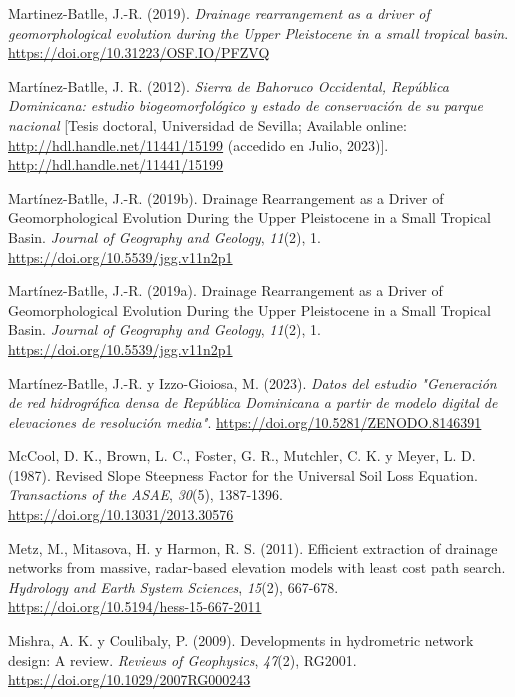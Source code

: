 \documentclass[spanish]{article}
\newlength{\cslhangindent}
\newlength{\cslentryspacingunit} %
\newenvironment{CSLReferences}[2] %
 {%
  \setlength{\parindent}{0pt}
  \ifodd #1
  \let\oldpar\par
  \def\par{\hangindent=\cslhangindent\oldpar}
  \fi
  \setlength{\parskip}{#2\cslentryspacingunit}
 }%
 {}
\begin{document}
\begin{CSLReferences}{1}{0}
\leavevmode{}%
Martinez-Batlle, J.-R. (2019). \emph{Drainage rearrangement as a driver
of geomorphological evolution during the Upper Pleistocene in a small
tropical basin}. \url{https://doi.org/10.31223/OSF.IO/PFZVQ}

\leavevmode{}%
Martínez-Batlle, J. R. (2012). \emph{{Sierra de Bahoruco Occidental,
República Dominicana: estudio biogeomorfológico y estado de conservación
de su parque nacional}} {[}Tesis doctoral, Universidad de Sevilla;
Available online: \url{http://hdl.handle.net/11441/15199} (accedido en
Julio, 2023){]}. \url{http://hdl.handle.net/11441/15199}

\leavevmode{}%
Martínez-Batlle, J.-R. (2019b). Drainage Rearrangement as a Driver of
Geomorphological Evolution During the Upper Pleistocene in a Small
Tropical Basin. \emph{Journal of Geography and Geology}, \emph{11}(2),
1. \url{https://doi.org/10.5539/jgg.v11n2p1}

\leavevmode{}%
Martínez-Batlle, J.-R. (2019a). Drainage Rearrangement as a Driver of
Geomorphological Evolution During the Upper Pleistocene in a Small
Tropical Basin. \emph{Journal of Geography and Geology}, \emph{11}(2),
1. \url{https://doi.org/10.5539/jgg.v11n2p1}

\leavevmode{}%
Martínez-Batlle, J.-R. y Izzo-Gioiosa, M. (2023). \emph{Datos del
estudio "Generación de red hidrográfica densa de República Dominicana a
partir de modelo digital de elevaciones de resolución media"}.
\url{https://doi.org/10.5281/ZENODO.8146391}

\leavevmode{}%
McCool, D. K., Brown, L. C., Foster, G. R., Mutchler, C. K. y Meyer, L.
D. (1987). Revised Slope Steepness Factor for the Universal Soil Loss
Equation. \emph{Transactions of the ASAE}, \emph{30}(5), 1387-1396.
\url{https://doi.org/10.13031/2013.30576}

\leavevmode{}%
Metz, M., Mitasova, H. y Harmon, R. S. (2011). Efficient extraction of
drainage networks from massive, radar-based elevation models with least
cost path search. \emph{Hydrology and Earth System Sciences},
\emph{15}(2), 667-678. \url{https://doi.org/10.5194/hess-15-667-2011}

\leavevmode{}%
Mishra, A. K. y Coulibaly, P. (2009). Developments in hydrometric
network design: A review. \emph{Reviews of Geophysics}, \emph{47}(2),
RG2001. \url{https://doi.org/10.1029/2007RG000243}


\end{CSLReferences}
\end{document}
